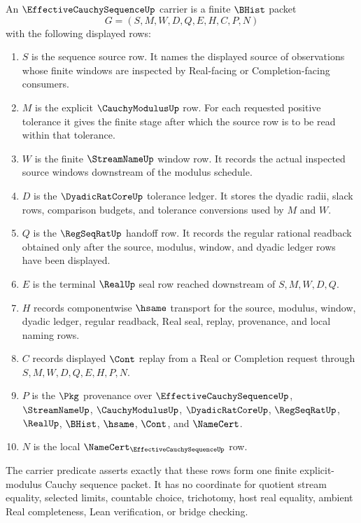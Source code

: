 \begin{definition}\label{def:effective-cauchy-sequence-carrier}
An $\EffectiveCauchySequenceUp$ carrier is a finite $\BHist$ packet
$$
G=(S,M,W,D,Q,E,H,C,P,N)
$$
with the following displayed rows:
\begin{enumerate}
\item $S$ is the sequence source row. It names the displayed source of observations whose finite windows are inspected by Real-facing or Completion-facing consumers.
\item $M$ is the explicit $\CauchyModulusUp$ row. For each requested positive tolerance it gives the finite stage after which the source row is to be read within that tolerance.
\item $W$ is the finite $\StreamNameUp$ window row. It records the actual inspected source windows downstream of the modulus schedule.
\item $D$ is the $\DyadicRatCoreUp$ tolerance ledger. It stores the dyadic radii, slack rows, comparison budgets, and tolerance conversions used by $M$ and $W$.
\item $Q$ is the $\RegSeqRatUp$ handoff row. It records the regular rational readback obtained only after the source, modulus, window, and dyadic ledger rows have been displayed.
\item $E$ is the terminal $\RealUp$ seal row reached downstream of $S,M,W,D,Q$.
\item $H$ records componentwise $\hsame$ transport for the source, modulus, window, dyadic ledger, regular readback, Real seal, replay, provenance, and local naming rows.
\item $C$ records displayed $\Cont$ replay from a Real or Completion request through $S,M,W,D,Q,E,H,P,N$.
\item $P$ is the $\Pkg$ provenance over $\EffectiveCauchySequenceUp$, $\StreamNameUp$, $\CauchyModulusUp$, $\DyadicRatCoreUp$, $\RegSeqRatUp$, $\RealUp$, $\BHist$, $\hsame$, $\Cont$, and $\NameCert$.
\item $N$ is the local $\NameCert_{\EffectiveCauchySequenceUp}$ row.
\end{enumerate}
The carrier predicate asserts exactly that these rows form one finite explicit-modulus Cauchy sequence packet. It has no coordinate for quotient stream equality, selected limits, countable choice, trichotomy, host real equality, ambient Real completeness, Lean verification, or bridge checking.
\end{definition}

